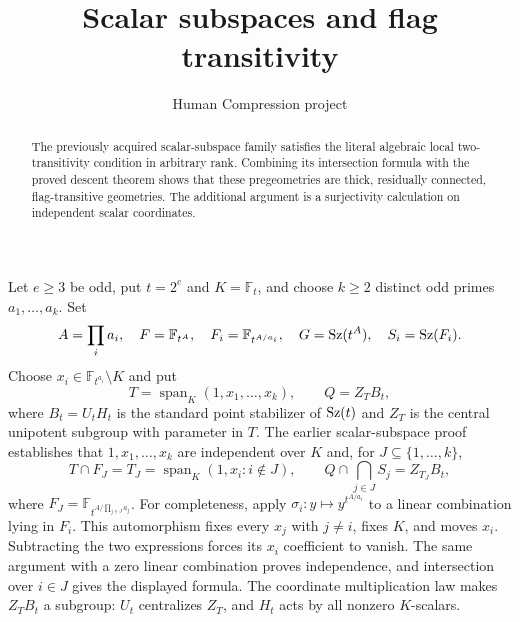 \documentclass[11pt,a4paper]{article}
\title{Scalar subspaces and flag transitivity}
\author{Human Compression project}\date{}
\newcommand{\F}{\mathbb F}
\begin{document}
\maketitle
\begin{abstract}
The previously acquired scalar-subspace family satisfies the literal
algebraic local two-transitivity condition in arbitrary rank. Combining
its intersection formula with the proved descent theorem shows that
these pregeometries are thick, residually connected, flag-transitive
geometries. The additional argument is a surjectivity calculation on
independent scalar coordinates.
\end{abstract}

Let $e\ge3$ be odd, put $t=2^e$ and $K=\F_t$, and choose $k\ge2$
distinct odd primes $a_1,\ldots,a_k$. Set
\[
 A=\prod_i a_i,\quad F=\F_{t^A},\quad
 F_i=\F_{t^{A/a_i}},\quad G=\Sz(t^A),\quad S_i=\Sz(F_i).
\]
Choose $x_i\in\F_{t^{a_i}}\setminus K$ and put
\[
 T=\operatorname{span}_K(1,x_1,\ldots,x_k),\qquad
 Q=Z_TB_t,
\]
where $B_t=U_tH_t$ is the standard point stabilizer of $\operatorname{Sz}(t)$ and
$Z_T$ is the central unipotent subgroup with parameter in $T$.
The earlier scalar-subspace proof establishes that $1,x_1,\ldots,x_k$
are independent over $K$ and, for $J\subseteq\{1,\ldots,k\}$,
\[
 T\cap F_J=T_J=\operatorname{span}_K(1,x_i:i\notin J),\qquad
 Q\cap\bigcap_{j\in J}S_j=Z_{T_J}B_t,
 \tag{1}
\]
where $F_J=\F_{t^{A/\prod_{j\in J}a_j}}$.
For completeness, apply $\sigma_i:y\mapsto y^{t^{A/a_i}}$ to a
linear combination lying in $F_i$. This automorphism fixes every $x_j$
with $j\ne i$, fixes $K$, and moves $x_i$. Subtracting the two
expressions forces its $x_i$ coefficient to vanish. The same argument
with a zero linear combination proves independence, and intersection
over $i\in J$ gives the displayed formula.
The coordinate multiplication law makes $Z_TB_t$ a subgroup: $U_t$
centralizes $Z_T$, and $H_t$ acts by all nonzero $K$-scalars.
\end{document}

